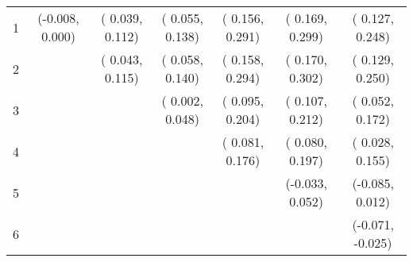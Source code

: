 \begin{table}[!ht]
\begin{tabular}{lcccccc}
  1     & (-0.008,  0.000) & ( 0.039,  0.112) & ( 0.055,  0.138) & ( 0.156,  0.291) & ( 0.169,  0.299) & ( 0.127,  0.248) \\
  2     &                  & ( 0.043,  0.115) & ( 0.058,  0.140) & ( 0.158,  0.294) & ( 0.170,  0.302) & ( 0.129,  0.250) \\
  3     &                  &                  & ( 0.002,  0.048) & ( 0.095,  0.204) & ( 0.107,  0.212) & ( 0.052,  0.172) \\
  4     &                  &                  &                  & ( 0.081,  0.176) & ( 0.080,  0.197) & ( 0.028,  0.155) \\
  5     &                  &                  &                  &                  & (-0.033,  0.052) & (-0.085,  0.012) \\
  6     &                  &                  &                  &                  &                  & (-0.071, -0.025) \\
  \bottomrule
\end{tabular}
\label{tbl:bootstrap}
\end{table}
